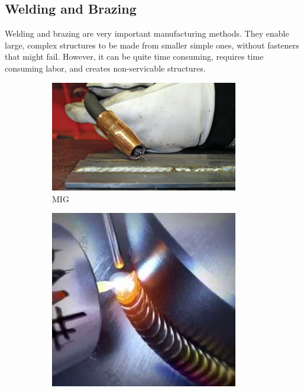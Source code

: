 \documentclass[10pt,letterpaper]{book}
\begin{document}
 	\subsection{Welding and Brazing}
 	
 	Welding and brazing are very important manufacturing methods. They enable large, complex structures to be made from smaller simple ones, without fasteners that might fail. However, it can be quite time consuming, requires time consuming labor, and creates non-servicable structures.
 	
 	\begin{figure}[H]
		\centering
		\begin{subfigure}[b]{.24\linewidth}
			\includegraphics[width=0.9\textwidth]{imgs/mig.png}
			\caption{MIG}
		\end{subfigure}\begin{subfigure}[b]{.24\linewidth}
			\includegraphics[width=0.9\textwidth]{imgs/tig.png}

\end{subfigure}
\end{figure}
\end{document}

